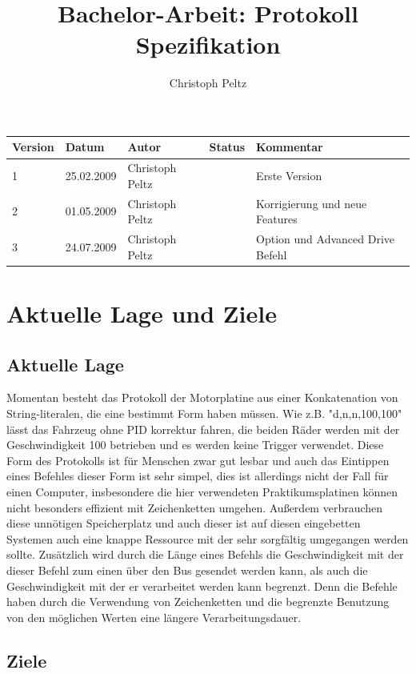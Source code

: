 \documentclass[a4paper]{article}
\title{Bachelor-Arbeit: Protokoll Spezifikation}
\author{Christoph Peltz}
\begin{document}
\maketitle
	\begin{tabularx}{\linewidth}{|l|l|l|l|X|}
		\hline
		\textbf{Version} & \textbf{Datum} & \textbf{Autor} 	& \textbf{Status} & \textbf{Kommentar} \\
		\hline
		\hline
		1 				 & 25.02.2009 	  & Christoph Peltz & 				  & Erste Version \\
		2 				 & 01.05.2009 	  & Christoph Peltz & 				  & Korrigierung und neue Features \\
		3				 & 24.07.2009	  & Christoph Peltz &				  & Option und Advanced Drive Befehl \\
		\hline
	\end{tabularx}

\pagebreak
\tableofcontents
\pagebreak
	\section{Aktuelle Lage und Ziele}

	\subsection{Aktuelle Lage}

	Momentan besteht das Protokoll der Motorplatine aus einer Konkatenation von String-literalen, die eine bestimmt Form haben müssen.
	Wie z.B. "d,n,n,100,100" lässt das Fahrzeug ohne PID korrektur fahren, die beiden Räder werden mit der Geschwindigkeit 100
	betrieben und es werden keine Trigger verwendet. Diese Form des Protokolls ist für Menschen zwar gut lesbar und auch das Eintippen
	eines Befehles dieser Form ist sehr simpel, dies ist allerdings nicht der Fall für einen Computer, insbesondere die hier
	verwendeten Praktikumsplatinen können nicht besonders effizient mit Zeichenketten umgehen. Außerdem verbrauchen diese unnötigen
	Speicherplatz und auch dieser ist auf diesen eingebetten Systemen auch eine knappe Ressource mit der sehr sorgfältig umgegangen
	werden sollte. Zusätzlich wird durch die Länge eines Befehls die Geschwindigkeit mit der dieser Befehl zum einen über den Bus
	gesendet werden kann, als auch die Geschwindigkeit mit der er verarbeitet werden kann begrenzt. Denn die Befehle haben durch
	die Verwendung von Zeichenketten und die begrenzte Benutzung von den möglichen Werten eine längere Verarbeitungsdauer.

	\subsection{Ziele}
\end{document}

